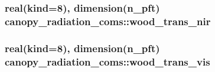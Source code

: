\subsubsection[{\texorpdfstring{wood\+\_\+trans\+\_\+nir}{wood_trans_nir}}]{\setlength{\rightskip}{0pt plus 5cm}real(kind=8), dimension(n\+\_\+pft) canopy\+\_\+radiation\+\_\+coms\+::wood\+\_\+trans\+\_\+nir}\hypertarget{namespacecanopy__radiation__coms_ac71bbd6b94c73251f3181441d9930d48}{}\label{namespacecanopy__radiation__coms_ac71bbd6b94c73251f3181441d9930d48}
\subsubsection[{\texorpdfstring{wood\+\_\+trans\+\_\+vis}{wood_trans_vis}}]{\setlength{\rightskip}{0pt plus 5cm}real(kind=8), dimension(n\+\_\+pft) canopy\+\_\+radiation\+\_\+coms\+::wood\+\_\+trans\+\_\+vis}\hypertarget{namespacecanopy__radiation__coms_add3e4a271e770993c7867304bd138bf2}{}\label{namespacecanopy__radiation__coms_add3e4a271e770993c7867304bd138bf2}
